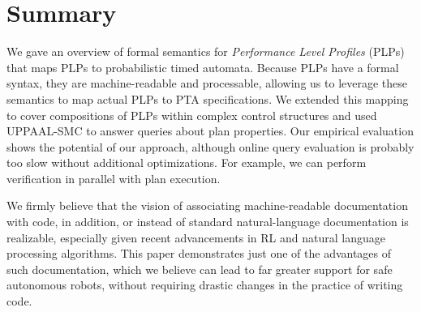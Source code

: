 \documentclass[letterpaper]{article}
\begin{document}
\section{Summary}
We gave an overview of formal semantics for {\em Performance Level Profiles\/} (PLPs) that maps PLPs to probabilistic timed automata. Because PLPs have a formal syntax, they are machine-readable and processable, allowing us to leverage these semantics to map actual PLPs to PTA specifications. We extended this mapping to cover compositions of PLPs within complex control structures and used UPPAAL-SMC to answer queries about plan properties.
Our empirical evaluation shows the potential of our approach, although 
 online query evaluation is probably too slow without additional optimizations. For example, we can perform verification in parallel with plan execution.

We firmly believe that the vision of associating machine-readable documentation with code, in addition, or instead of standard natural-language documentation is realizable, especially given recent advancements in RL and natural language processing algorithms. This paper demonstrates just one of the advantages of such documentation, which
we believe can lead to far greater support for safe autonomous robots,
without requiring drastic changes in the practice of writing code.
\end{document}
